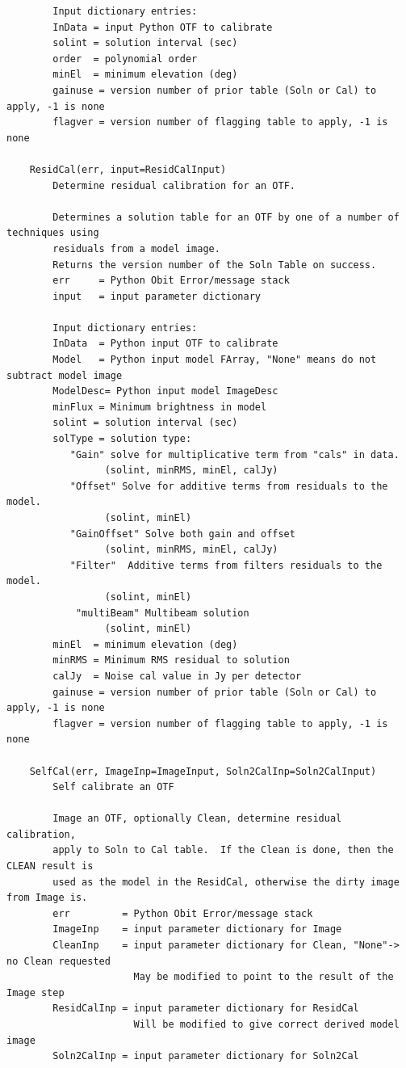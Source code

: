 \documentclass[11pt]{report}
\begin{document}
\begin{verbatim}
        Input dictionary entries:
        InData = input Python OTF to calibrate
        solint = solution interval (sec)
        order  = polynomial order
        minEl  = minimum elevation (deg)
        gainuse = version number of prior table (Soln or Cal) to apply, -1 is none
        flagver = version number of flagging table to apply, -1 is none
    
    ResidCal(err, input=ResidCalInput)
        Determine residual calibration for an OTF.
        
        Determines a solution table for an OTF by one of a number of techniques using
        residuals from a model image.
        Returns the version number of the Soln Table on success.
        err     = Python Obit Error/message stack
        input   = input parameter dictionary
        
        Input dictionary entries:
        InData  = Python input OTF to calibrate
        Model   = Python input model FArray, "None" means do not subtract model image
        ModelDesc= Python input model ImageDesc
        minFlux = Minimum brightness in model
        solint = solution interval (sec)
        solType = solution type:
           "Gain" solve for multiplicative term from "cals" in data.
                 (solint, minRMS, minEl, calJy)
           "Offset" Solve for additive terms from residuals to the model.
                 (solint, minEl)
           "GainOffset" Solve both gain and offset
                 (solint, minRMS, minEl, calJy)
           "Filter"  Additive terms from filters residuals to the model.
                 (solint, minEl)
            "multiBeam" Multibeam solution
                 (solint, minEl)
        minEl  = minimum elevation (deg)
        minRMS = Minimum RMS residual to solution
        calJy  = Noise cal value in Jy per detector 
        gainuse = version number of prior table (Soln or Cal) to apply, -1 is none
        flagver = version number of flagging table to apply, -1 is none
    
    SelfCal(err, ImageInp=ImageInput, Soln2CalInp=Soln2CalInput)
        Self calibrate an OTF
        
        Image an OTF, optionally Clean, determine residual calibration,
        apply to Soln to Cal table.  If the Clean is done, then the CLEAN result is
        used as the model in the ResidCal, otherwise the dirty image from Image is.
        err         = Python Obit Error/message stack
        ImageInp    = input parameter dictionary for Image
        CleanInp    = input parameter dictionary for Clean, "None"-> no Clean requested
                      May be modified to point to the result of the Image step
        ResidCalInp = input parameter dictionary for ResidCal
                      Will be modified to give correct derived model image
        Soln2CalInp = input parameter dictionary for Soln2Cal
    

\end{verbatim}
\end{document}
